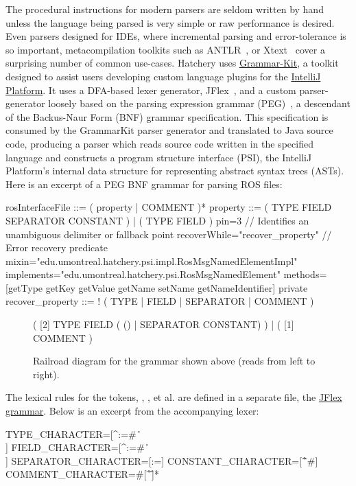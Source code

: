 The procedural instructions for modern parsers are seldom written by hand unless the language being parsed is very simple or raw performance is desired. Even parsers designed for IDEs, where incremental parsing and error-tolerance is so important, metacompilation toolkits such as ANTLR~\citep{parr1995antlr}, or Xtext~\citep{eysholdt2010xtext} cover a surprising number of common use-cases. Hatchery uses \href{https://github.com/JetBrains/grammar-kit}{Grammar-Kit}, a toolkit designed to assist users developing custom language plugins for the \href{https://www.jetbrains.org/intellij/sdk/docs}{IntelliJ Platform}. It uses a DFA-based lexer generator, JFlex~\citep{klein2001jflex}, and a custom parser-generator loosely based on the parsing expression grammar (PEG)~\citep{ford2004parsing}, a descendant of the Backus-Naur Form (BNF) grammar specification. This specification is consumed by the GrammarKit parser generator and translated to Java source code, producing a parser which reads source code written in the specified language and constructs a program structure interface (PSI), the IntelliJ Platform's internal data structure for representing abstract syntax trees (ASTs). Here is an excerpt of a PEG BNF grammar for parsing ROS \href{https://wiki.ros.org/msg}{} files:
%
\begin{bnflisting}
rosInterfaceFile ::= ( property | COMMENT )*
property ::= ( TYPE FIELD SEPARATOR CONSTANT ) | ( TYPE FIELD ) {
    pin=3 // Identifies an unambiguous delimiter or fallback point
    recoverWhile="recover_property" // Error recovery predicate
    mixin="edu.umontreal.hatchery.psi.impl.RosMsgNamedElementImpl"
    implements="edu.umontreal.hatchery.psi.RosMsgNamedElement"
    methods=[getType getKey getValue getName setName getNameIdentifier]
}
private recover_property ::= ! ( TYPE | FIELD | SEPARATOR | COMMENT )
\end{bnflisting}
%
\begin{figure}
\centering
\begin{rail}
( [2] TYPE FIELD ( () | SEPARATOR CONSTANT) ) | ( [1] COMMENT )
\end{rail}
\caption{Railroad diagram for the grammar shown above (reads from left to right).}
\label{fig:railroad}
\end{figure}
%
The lexical rules for the tokens, , ,  et al. are defined in a separate  file, the \href{https://www.jflex.de/manual.html#Grammar}{JFlex grammar}. Below is an excerpt from the accompanying  lexer:
%
\begin{flexlisting}
TYPE_CHARACTER=[^:=#\ \r\n\t\f\\]
FIELD_CHARACTER=[^:=#\ \r\n\t\f\\]
SEPARATOR_CHARACTER=[:=]
CONSTANT_CHARACTER=[^\r\n\f#]
COMMENT_CHARACTER=#[^\r\n\f]*
\end{flexlisting}


